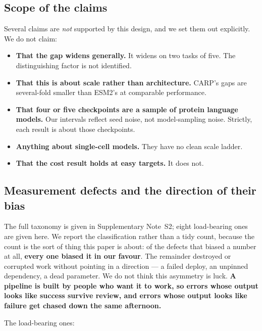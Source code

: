 \documentclass[11pt]{article}
\begin{document}
\subsection{Scope of the claims}

Several claims are \emph{not} supported by this design, and we set them out
explicitly. We do not claim:

\begin{itemize}
\itemsep2pt
\item \textbf{That the gap widens generally.} It widens on two tasks of five. The
distinguishing factor is not identified.
\item \textbf{That this is about scale rather than architecture.} CARP's gaps are
several-fold smaller than ESM2's at comparable performance.
\item \textbf{That four or five checkpoints are a sample of protein language
models.} Our intervals reflect seed noise, not model-sampling noise. Strictly,
each result is about those checkpoints.
\item \textbf{Anything about single-cell models.} They have no clean scale ladder.
\item \textbf{That the cost result holds at easy targets.} It does not.
\end{itemize}

\subsection{Measurement defects and the direction of their bias}
\label{sec:defects}

The full taxonomy is given in Supplementary Note~S2; eight load-bearing ones
are given here. We report the classification rather than a tidy count, because
the count is the sort of thing this paper is about: of the defects that biased a number at all,
\textbf{every one biased it in our favour}. The remainder destroyed or corrupted
work without pointing in a direction --- a failed deploy, an unpinned dependency,
a dead parameter. We do not think this asymmetry is luck. \textbf{A pipeline is
built by people who want it to work, so errors whose output looks like success
survive review, and errors whose output looks like failure get chased down the
same afternoon.}

The load-bearing ones:
\end{document}
